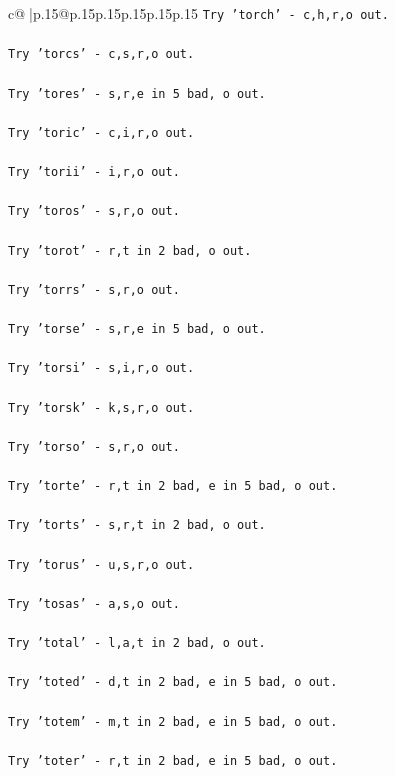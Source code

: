 \documentclass{article}
\begin{document}
{\begin{supertabular}{c@{$\;$}|p{.15\linewidth}@{}p{.15\linewidth}p{.15\linewidth}p{.15\linewidth}p{.15\linewidth}p{.15\linewidth}}
{{{\texttt{Try 'torch' {-} c,h,r,o out.} \\
\\ 
\texttt{Try 'torcs' {-} c,s,r,o out.} \\
\\ 
\texttt{Try 'tores' {-} s,r,e in 5 bad, o out.} \\
\\ 
\texttt{Try 'toric' {-} c,i,r,o out.} \\
\\ 
\texttt{Try 'torii' {-} i,r,o out.} \\
\\ 
\texttt{Try 'toros' {-} s,r,o out.} \\
\\ 
\texttt{Try 'torot' {-} r,t in 2 bad, o out.} \\
\\ 
\texttt{Try 'torrs' {-} s,r,o out.} \\
\\ 
\texttt{Try 'torse' {-} s,r,e in 5 bad, o out.} \\
\\ 
\texttt{Try 'torsi' {-} s,i,r,o out.} \\
\\ 
\texttt{Try 'torsk' {-} k,s,r,o out.} \\
\\ 
\texttt{Try 'torso' {-} s,r,o out.} \\
\\ 
\texttt{Try 'torte' {-} r,t in 2 bad, e in 5 bad, o out.} \\
\\ 
\texttt{Try 'torts' {-} s,r,t in 2 bad, o out.} \\
\\ 
\texttt{Try 'torus' {-} u,s,r,o out.} \\
\\ 
\texttt{Try 'tosas' {-} a,s,o out.} \\
\\ 
\texttt{Try 'total' {-} l,a,t in 2 bad, o out.} \\
\\ 
\texttt{Try 'toted' {-} d,t in 2 bad, e in 5 bad, o out.} \\
\\ 
\texttt{Try 'totem' {-} m,t in 2 bad, e in 5 bad, o out.} \\
\\ 
\texttt{Try 'toter' {-} r,t in 2 bad, e in 5 bad, o out.} \\
\\ 
}}}
\end{supertabular}}
\end{document}
